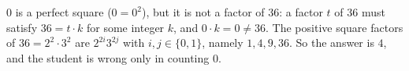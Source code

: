 $0$ is a perfect square ($0=0^2$), but it is not a factor of $36$: a factor $t$ of $36$ must satisfy $36=t\cdot k$ for some integer $k$, and $0\cdot k=0\ne36$. The positive square factors of $36=2^2\cdot3^2$ are $2^{2i}3^{2j}$ with $i,j\in\{0,1\}$, namely $1,4,9,36$. So the answer is $\boxed{4}$, and the student is wrong only in counting $0$.
